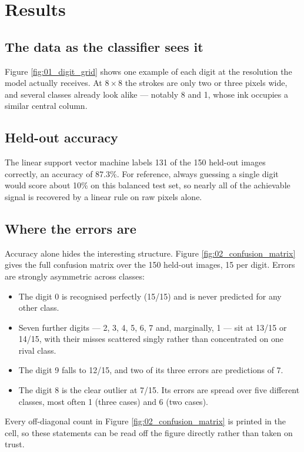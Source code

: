 \section{Results}
\label{sec:results}

\subsection{The data as the classifier sees it}

Figure \ref{fig:01_digit_grid} shows one example of each digit at the
resolution the model actually receives. At $8\times8$ the strokes are only two
or three pixels wide, and several classes already look alike --- notably 8 and
1, whose ink occupies a similar central column.

\subsection{Held-out accuracy}

The linear support vector machine labels 131 of the 150 held-out images
correctly, an accuracy of 87.3\%. For reference, always guessing a single digit
would score about 10\% on this balanced test set, so nearly all of the
achievable signal is recovered by a linear rule on raw pixels alone.

\subsection{Where the errors are}

Accuracy alone hides the interesting structure. Figure
\ref{fig:02_confusion_matrix} gives the full confusion matrix over the 150
held-out images, 15 per digit. Errors are strongly asymmetric across classes:

\begin{itemize}
  \item The digit 0 is recognised perfectly (15/15) and is never predicted for
    any other class.
  \item Seven further digits --- 2, 3, 4, 5, 6, 7 and, marginally, 1 --- sit at
    13/15 or 14/15, with their misses scattered singly rather than concentrated
    on one rival class.
  \item The digit 9 falls to 12/15, and two of its three errors are predictions
    of 7.
  \item The digit 8 is the clear outlier at 7/15. Its errors are spread over
    five different classes, most often 1 (three cases) and 6 (two cases).
\end{itemize}

Every off-diagonal count in Figure \ref{fig:02_confusion_matrix} is printed in
the cell, so these statements can be read off the figure directly rather than
taken on trust.

